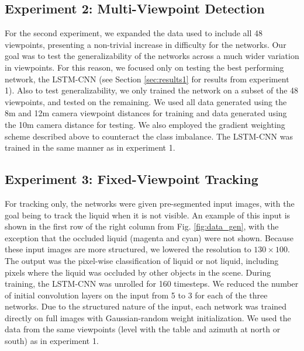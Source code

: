 \documentclass[runningheads,a4paper]{llncs}
\begin{document}
\vspace{-0.3cm}
\subsection{Experiment 2: Multi-Viewpoint Detection}
\vspace{-0.3cm}

For the second experiment, we expanded the data used to include all 48 viewpoints, presenting a non-trivial increase in difficulty for the networks. 
Our goal was to test the generalizability of the networks across a much wider variation in viewpoints. 
For this reason, we focused only on testing the best performing network, the LSTM-CNN (see Section \ref{sec:results1} for results from experiment 1).
Also to test generalizability, we only trained the network on a subset of the 48 viewpoints, and tested on the remaining.
We used all data generated using the 8m and 12m camera viewpoint distances for training and data generated using the 10m camera distance for testing.  
We also employed the gradient weighting scheme described above to counteract the class imbalance.
The LSTM-CNN was trained in the same manner as in experiment 1.

\vspace{-0.3cm}
\subsection{Experiment 3: Fixed-Viewpoint Tracking}
\vspace{-0.3cm}

For tracking only, the networks were given pre-segmented input images, with the goal being to track the liquid when it is not visible. An example of this input is shown in the first row of the right column from Fig. \ref{fig:data_gen}, with the exception that the occluded liquid (magenta and cyan) were not shown. Because these input images are more structured, we lowered the resolution to $130 \times 100$. The output was the pixel-wise classification of liquid or not liquid, including pixels where the liquid was occluded by other objects in the scene. During training, the LSTM-CNN was unrolled for 160 timesteps. We reduced the number of initial convolution layers on the input from 5 to 3 for each of the three networks. Due to the structured nature of the input, each network was trained directly on full images with Gaussian-random weight initialization. We used the data from the same viewpoints (level with the table and azimuth at north or south) as in experiment 1.
\end{document}
